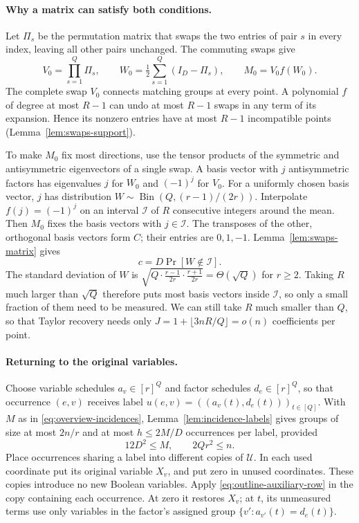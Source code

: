 \paragraph{Why a matrix can satisfy both conditions.}
Let $\Pi_s$ be the permutation matrix that
swaps the two entries of pair $s$ in every index, leaving all
other pairs unchanged.
The commuting swaps give
\[
 V_0=\prod_{s=1}^Q\Pi_s,\qquad
 W_0=\tfrac12\sum_{s=1}^Q(I_D-\Pi_s),\qquad M_0=V_0f(W_0).
\]
The complete swap $V_0$ connects matching groups at every point.
A polynomial $f$ of degree at most $R-1$ can undo at most $R-1$
swaps in any term of its expansion. Hence its nonzero entries have
at most $R-1$ incompatible points
(Lemma~\ref{lem:swaps-support}).

To make $M_0$ fix most directions, use the tensor products of the
symmetric and antisymmetric eigenvectors of a single swap. A basis
vector with $j$ antisymmetric factors has eigenvalues $j$ for $W_0$
and $(-1)^j$ for $V_0$. For a uniformly chosen basis vector,
$j$ has distribution $W\sim\operatorname{Bin}(Q,(r-1)/(2r))$.
Interpolate $f(j)=(-1)^j$ on an interval $\mathcal I$ of $R$
consecutive integers around the mean. Then $M_0$ fixes the basis
vectors with $j\in\mathcal I$. The transposes of the other,
orthogonal basis vectors form $C$; their entries are $0,1,-1$.
Lemma~\ref{lem:swaps-matrix} gives
\[
 c=D\Pr[W\notin\mathcal I].
\]
The standard deviation of $W$ is $\sqrt{Q\cdot\frac{r-1}{2r}\cdot\frac{r+1}{2r}}=\Theta(\sqrt Q)$ for $r\ge2$.
Taking $R$ much larger than $\sqrt Q$ therefore puts most basis vectors inside $\mathcal I$, so only a small fraction of them need to be measured.
We can still take $R$ much smaller than $Q$, so that Taylor recovery needs only $J=1+\lfloor3nR/Q\rfloor=o(n)$ coefficients per point.

\paragraph{Returning to the original variables.}
Choose variable schedules $a_v\in[r]^Q$ and factor schedules
$d_e\in[r]^Q$, so that occurrence $(e,v)$ receives label
$u(e,v)=((a_v(t),d_e(t)))_{t\in[Q]}$. With $M$ as in
\eqref{eq:overview-incidences}, Lemma~\ref{lem:incidence-labels}
gives groups of size at most $2n/r$ and at
most $h\le2M/D$ occurrences per label, provided
\[
 12D^2\le M,\qquad 2Qr^2\le n.
\]
Place occurrences sharing a label into different copies of
$\mathcal U$. In each used coordinate put its original variable
$X_v$, and put zero in unused coordinates. These copies introduce
no new Boolean variables. Apply \eqref{eq:outline-auxiliary-row}
in the copy containing each occurrence. At zero it restores $X_v$;
at $t$, its unmeasured terms use only variables in the factor's
assigned group $\{v':a_{v'}(t)=d_e(t)\}$.


